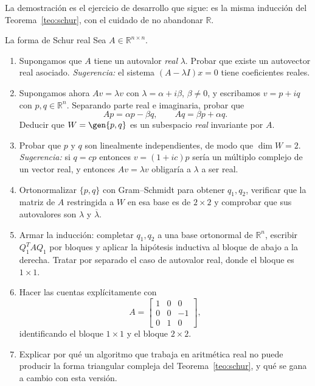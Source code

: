 La demostración es el ejercicio de desarrollo que sigue: es la misma inducción del
Teorema~\ref{teo:schur}, con el cuidado de no abandonar $\mathbb{R}$.

\begin{entrega}{La forma de Schur real}\label{ent:schur-real}
Sea $A\in\mathbb{R}^{n\times n}$.

\begin{enumerate}[label=\textbf{(\alph*)},itemsep=3pt,topsep=4pt]
\item Supongamos que $A$ tiene un autovalor \emph{real} $\lambda$. Probar que existe un
autovector real asociado. \emph{Sugerencia:} el sistema $(A-\lambda I)x=0$ tiene
coeficientes reales.

\item Supongamos ahora $Av=\lambda v$ con $\lambda=\alpha+i\beta$, $\beta\neq0$, y
escribamos $v=p+iq$ con $p,q\in\mathbb{R}^{n}$. Separando parte real e imaginaria,
probar que
\[
Ap=\alpha p-\beta q,
\qquad
Aq=\beta p+\alpha q .
\]
Deducir que $W=\gen\{p,q\}$ es un subespacio \emph{real} invariante por $A$.

\item Probar que $p$ y $q$ son linealmente independientes, de modo que $\dim W=2$.
\emph{Sugerencia:} si $q=cp$ entonces $v=(1+ic)p$ sería un múltiplo complejo de un vector
real, y entonces $Av=\lambda v$ obligaría a $\lambda$ a ser real.

\item Ortonormalizar $\{p,q\}$ con Gram--Schmidt para obtener $q_1,q_2$, verificar que la
matriz de $A$ restringida a $W$ en esa base es de $2\times2$ y comprobar que sus
autovalores son $\lambda$ y $\overline{\lambda}$.

\item Armar la inducción: completar $q_1,q_2$ a una base ortonormal de $\mathbb{R}^{n}$,
escribir $Q_1^{T}AQ_1$ por bloques y aplicar la hipótesis inductiva al bloque de abajo a
la derecha. Tratar por separado el caso de autovalor real, donde el bloque es $1\times1$.

\item Hacer las cuentas explícitamente con
\[
A=\begin{bmatrix} 1&0&0\\ 0&0&-1\\ 0&1&0\end{bmatrix},
\]
identificando el bloque $1\times1$ y el bloque $2\times2$.

\item Explicar por qué un algoritmo que trabaja en aritmética real no puede producir la
forma triangular compleja del Teorema~\ref{teo:schur}, y qué se gana a cambio con esta
versión.
\end{enumerate}

\medskip
{}
\end{entrega}

